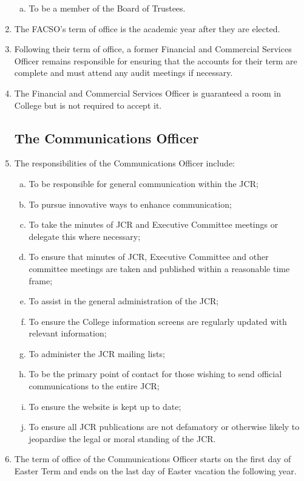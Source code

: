 \documentclass[12pt]{article}
\begin{document}
\begin{enumerate}
\begin{enumerate}[(a)]
        \item To be a member of the Board of Trustees.
    \end{enumerate}
    \item The FACSO's term of office is the academic year after they are elected.
    \item Following their term of office, a former Financial and Commercial Services Officer remains responsible for ensuring that the accounts for their term are complete and must attend any audit meetings if necessary.
    \item The Financial and Commercial Services Officer is guaranteed a room in College but is not required to accept it.
    \subsection{The Communications Officer}
    \item The responsibilities of the Communications Officer include:
    \begin{enumerate}[(a)]
        \item To be responsible for general communication within the JCR;
        \item To pursue innovative ways to enhance communication;
        \item To take the minutes of JCR and Executive Committee meetings or delegate this where necessary;
        \item To ensure that minutes of JCR, Executive Committee and other committee meetings are taken and published within a reasonable time frame;
        \item To assist in the general administration of the JCR;
        \item To ensure the College information screens are regularly updated with relevant information;
        \item To administer the JCR mailing lists;
        \item To be the primary point of contact for those wishing to send official communications to the entire JCR;
        \item To ensure the website is kept up to date;
        \item To ensure all JCR publications are not defamatory or otherwise likely to jeopardise the legal or moral standing of the JCR.
    \end{enumerate}
    \item The term of office of the Communications Officer starts on the first day of Easter Term and ends on the last day of Easter vacation the following year.

\end{enumerate}
\end{document}
